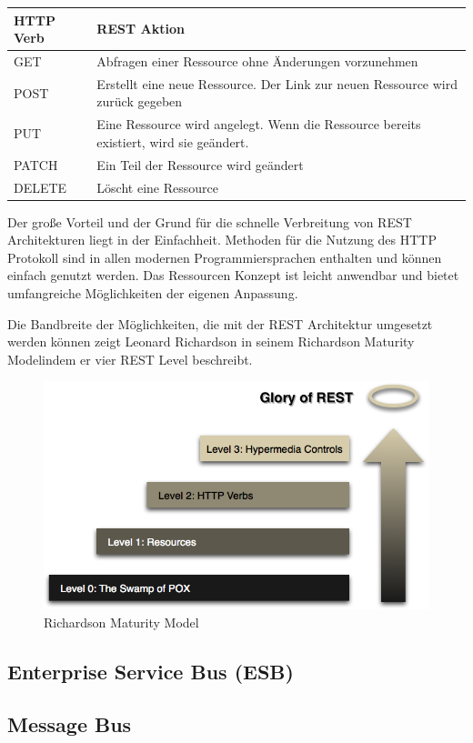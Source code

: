 	\begin{tabular}{|p{3.5cm}|p{12.5cm}|}
	\hline 
	HTTP Verb & REST Aktion \\ 
	\hline 
	GET & Abfragen einer Ressource ohne Änderungen vorzunehmen \\ 
	\hline 
	POST & Erstellt eine neue Ressource. Der Link zur neuen Ressource wird zurück gegeben \\ 
	\hline 
	PUT & Eine Ressource wird angelegt. Wenn die Ressource bereits existiert, wird sie geändert. \\ 
	\hline 
	PATCH & Ein Teil der Ressource wird geändert \\ 
	\hline 
	DELETE & Löscht eine Ressource \\ 
	\hline 
	\end{tabular} 
	
	Der große Vorteil und der Grund für die schnelle Verbreitung von REST Architekturen liegt in der Einfachheit. Methoden für die Nutzung des HTTP Protokoll sind in allen modernen Programmiersprachen enthalten und können einfach genutzt werden. Das Ressourcen Konzept ist leicht anwendbar und bietet umfangreiche Möglichkeiten der eigenen Anpassung.
	
	Die Bandbreite der Möglichkeiten, die mit der REST Architektur umgesetzt werden können zeigt Leonard Richardson in seinem \textacutedbl Richardson Maturity Model\textgravedbl indem er vier REST Level beschreibt.

	\begin{figure}[h]
		\centering
		\includegraphics[width=0.7\linewidth]{images/Richardson_Maturity_Model}
		\caption{Richardson Maturity Model}
		\label{fig:Richardson_Maturity_Model}
	\end{figure}
	
	\cite[vgl.][]{Fowler.2010}
	\subsection{Enterprise Service Bus (ESB)}
	\subsection{Message Bus}

